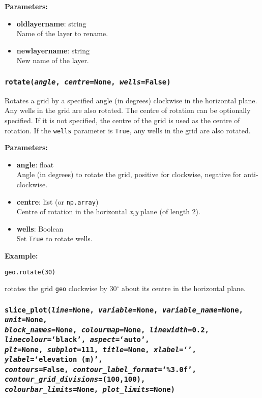 \textbf{Parameters:}
\begin{itemize}
  \item \textbf{oldlayername}: string\\
    Name of the layer to rename.
  \item \textbf{newlayername}: string\\
    New name of the layer.
\end{itemize}

\subsubsection{\texttt{rotate(\emph{angle}, \emph{centre}=\texttt{None}, \emph{wells}=\texttt{False})}}

Rotates a grid by a specified angle (in degrees) clockwise in the horizontal plane.  Any wells in the grid are also rotated.  The centre of rotation can be optionally specified.  If it is not specified, the centre of the grid is used as the centre of rotation.  If the \texttt{wells} parameter is \texttt{True}, any wells in the grid are also rotated.

\textbf{Parameters:}
\begin{itemize}
  \item \textbf{angle}: float\\
    Angle (in degrees) to rotate the grid, positive for clockwise, negative for anti-clockwise.
  \item \textbf{centre}: list (or \texttt{np.array})\\
    Centre of rotation in the horizontal \emph{x},\emph{y} plane (of length 2).
  \item \textbf{wells}: Boolean\\
    Set \texttt{True} to rotate wells.
\end{itemize}

\textbf{Example:}

\begin{verbatim}
geo.rotate(30)
\end{verbatim}

rotates the grid \texttt{geo} clockwise by 30$^{\circ}$ about its centre in the horizontal plane.

\subsubsection{\texttt{slice\_plot(\emph{line}=None, \emph{variable}=None, \emph{variable\_name}=None, \emph{unit}=None,\\
    \emph{block\_names}=None, \emph{colourmap}=None, \emph{linewidth}=0.2, \emph{linecolour}=`black', \emph{aspect}=`auto',\\
    \emph{plt}=None, \emph{subplot}=111, \emph{title}=None, \emph{xlabel}=`', \emph{ylabel}=`elevation (m)',\\
    \emph{contours}=False, \emph{contour\_label\_format}=`\%3.0f', \emph{contour\_grid\_divisions}=(100,100),\\
    \emph{colourbar\_limits}=None, \emph{plot\_limits}=None)}}

